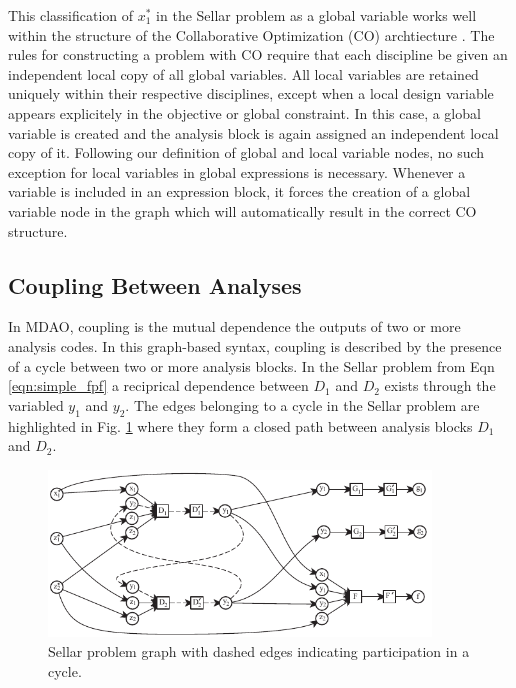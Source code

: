 This classification of $x_1^*$ in the Sellar problem
  as a global variable works well within the structure of the Collaborative 
  Optimization (CO) archtiecture \cite{braun1996thesis}. The rules for constructing 
  a problem with CO require that each discipline be given an independent local 
  copy of all global variables. All local variables are retained uniquely 
  within their respective disciplines, except when a local design variable appears 
  explicitely in the objective or global constraint. In this case, a global 
  variable is created and the analysis block is again assigned an 
  independent local copy of it. Following our definition of global and local variable 
  nodes, no such exception for local variables in global expressions is 
  necessary. Whenever a variable is included in an expression block, 
  it forces the creation of a global variable node in the graph which will 
automatically result in the correct CO structure.

  

\subsection{Coupling Between Analyses}
  In MDAO, coupling is the mutual dependence the outputs of two or more analysis 
  codes. In this graph-based syntax, coupling is described by the presence of a 
  cycle between two or more analysis blocks. In the Sellar problem from Eqn \ref{eqn:simple_fpf} 
  a reciprical dependence between $D_1$ and $D_2$ exists through the variabled $y_1$ and $y_2$. 
  The edges belonging to a cycle in the Sellar problem are highlighted in 
  Fig. \ref{f:sellar cycles} where they form a closed path between analysis blocks $D_1$ and $D_2$.

 \begin{figure}[htb!]
  \begin{center}
    \includegraphics[width=4.0in]{images/sellar_cycles}
  \end{center}
    \caption{Sellar problem graph with dashed edges indicating participation in a cycle.
\label{f:sellar cycles}
    }
\end{figure} 

